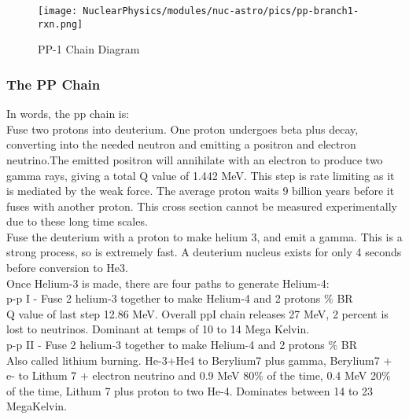                 
                            

            \begin{figure}[H]
                \centering
                \texttt{[image: NuclearPhysics/modules/nuc-astro/pics/pp-branch1-rxn.png]}
            \caption{PP-1 Chain Diagram}
            \end{figure}
                
                \subsubsection{The PP Chain}
                    \indent In words, the pp chain is:\\
                    \newline
                    Fuse two protons into deuterium. One proton undergoes beta plus decay, converting into the needed neutron and emitting a positron and electron neutrino.The emitted positron will annihilate with an electron to produce two gamma rays, giving a total Q value of 1.442 MeV. This step is rate limiting as it is mediated by the weak force. The average proton waits 9 billion years before it fuses with another proton. This cross section cannot be measured experimentally due to these long time scales.\\
                    \newline
                    Fuse the deuterium with a proton to make helium 3, and emit a gamma. This is a strong process, so is extremely fast. A deuterium nucleus exists for only 4 seconds before conversion to He3.\\
                    \newline
                    Once Helium-3 is made, there are four paths to generate Helium-4:\\
                    \newline
                    \indent p-p I \indent - \indent Fuse 2 helium-3 together to make Helium-4 and 2 protons \% BR\\ Q value of last step 12.86 MeV. Overall ppI chain releases 27 MeV, 2 percent is lost to neutrinos. Dominant at temps of 10 to 14 Mega Kelvin.\\
                    \newline
                    \indent p-p II \indent - \indent Fuse 2 helium-3 together to make Helium-4 and 2 protons \% BR\\ Also called lithium burning. He-3+He4 to Berylium7 plus gamma, Berylium7 + e- to Lithum 7 + electron neutrino and 0.9 MeV 80\% of the time, 0.4 MeV 20\% of the time, Lithum 7 plus proton to two He-4. Dominates between 14 to 23 MegaKelvin. \\
